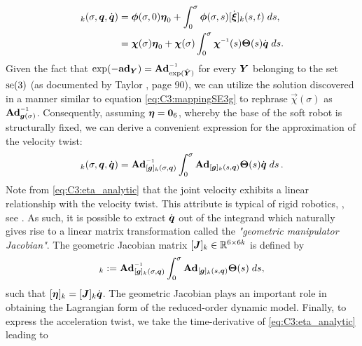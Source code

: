 %
\begin{align}
[\vec{\eta}]_k(\sigma,\vec{q},\dot{\vec{q}}) & = \phiB(\sigma,0)\etaB_0 + \int_0^\sigma \phiB(\sigma,s) [\dot{\vec{\xi}}]_k(s,t) \; ds, \notag \\
& = \vec{\chi}(\sigma) \etaB_0 + \vec{\chi}(\sigma)\int_0^\sigma \vec{\chi}\inv(s) \mat{\Theta}(s) \dot{\vec{q}} \; ds.
\end{align}
%
Given the fact that $\exp(-\ad_{\YB}) = \Ad\inv_{\exp(\hat{\YB})}$ for every ${\boldsymbol{Y}}$ belonging to the set $\textup{\textrm{se}}(3)$ (as documented by Taylor \cite{Taylor2010Jan}, page 90), we can utilize the solution discovered in a manner similar to equation \eqref{eq:C3:mappingSE3g} to rephrase $\vec{\chi}(\sigma)$ as $\Ad\inv_{\gB(\sigma)}$. Consequently, assuming ${\boldsymbol{\eta}} = \boldsymbol{0}_6$, whereby the base of the soft robot is structurally fixed, we can derive a convenient expression for the approximation of the velocity twist:%
%
\begin{align}
[\vec{\eta}]_k(\sigma,\vec{q},\dot{\vec{q}}) = \Ad_{[\mat{g}]_k(\sigma,\q)}\inv \int_0^\sigma \Ad_{[\mat{g}]_k(s,\q)} \mat{\Theta}(s) \dot{\vec{q}} \; ds \,. \label{eq:C3:eta_analytic}
\end{align}
%
Note from \eqref{eq:C3:eta_analytic} that the joint velocity exhibits a linear relationship with the velocity twist. This attribute is typical of rigid robotics, \eg, see \cite{Murray1994,Spong2006}. As such, it is possible to extract $\dot{{\boldsymbol{q}}}$ out of the integrand which naturally gives rise to a linear matrix transformation called the \textit{"geometric manipulator Jacobian"}. The geometric Jacobian matrix $[\boldsymbol{J}]_k \in \mathbb{R}^{6\times 6k}$ is defined by 
%
\begin{equation}
[\mat{J}]_k:= \Ad_{[\mat{g}]_k(\sigma,\q)}\inv \int_0^\sigma \Ad_{[\mat{g}]_k(s,\q)} \mat{\Theta}(s) \; ds, \label{eq:C3:jacobian_analytic}
\end{equation}
%
such that $[{\boldsymbol{\eta}}]_k = [{\boldsymbol{J}}]_k \dot{{\boldsymbol{q}}}$. The geometric Jacobian plays an important role in obtaining the Lagrangian form of the reduced-order dynamic model. Finally, to express the acceleration twist, we take the time-derivative of \eqref{eq:C3:eta_analytic} leading to

